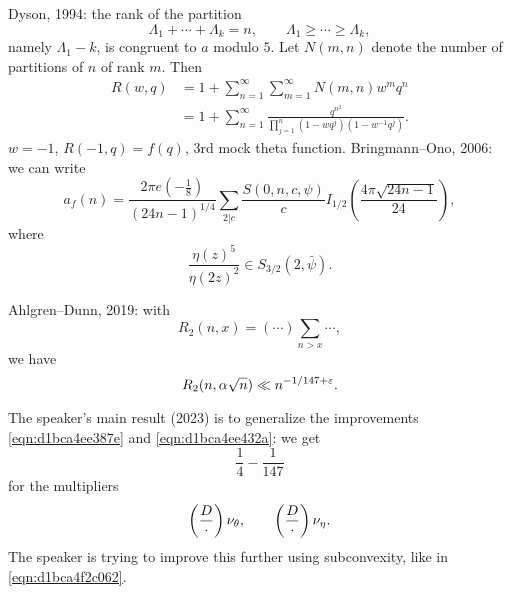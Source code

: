 \documentclass[reqno]{amsart} 
\begin{document}
\begin{enumerate}
  Dyson, 1994: the rank of the partition
  \begin{equation*}
    \Lambda_1 + \dotsb + \Lambda_k = n,
    \qquad
    \Lambda_1 \geq \dotsb \geq \Lambda_k,
  \end{equation*}
  namely $\Lambda_1 - k$, is congruent to $a$ modulo $5$.  Let $N (m, n)$ denote the number of partitions of $n$ of rank $m$.  Then
  \begin{align*}
    R (w, q) &= 1 + \sum_{n = 1}^\infty \sum_{m = 1}^\infty N (m, n) w^m q^n \\
             &=
               1 + \sum_{n = 1}^\infty
               \frac{q^{n^2 }}{\prod_{j = 1 }^n
               (1 - w q^j ) (1 - w^{-1} q^j )
               }.
  \end{align*}
  $w = - 1$, $R(-1,q) = f(q)$, $3$rd mock theta function.  Bringmann--Ono, 2006: we can write
  \begin{equation*}
    a_f (n) = \frac{2 \pi e (- \tfrac{1}{8})}{(2 4n - 1  )^{1/4} }
    \sum_{2 | c}
    \frac{S (0, n, c, \psi )}{c}
    I_{1/2} \left( \frac{4 \pi \sqrt{2 4 n - 1}}{24} \right),
  \end{equation*}
  where
  \begin{equation*}
    \frac{\eta (z)^5 }{ \eta (2 z )^2 }
    \in S_{3/2 } (2, \bar{\psi }).
  \end{equation*}

  Ahlgren--Dunn, 2019: with
  \begin{equation*}
    R_2(n,x) = (\dotsb) \sum_{n > x} \dotsb,
  \end{equation*}
  we have
  \begin{equation*}
    R_2 (n, \alpha \sqrt{n}) \ll n^{- 1 / 147 + \varepsilon}.
  \end{equation*}
\end{enumerate}
The speaker's main result (2023) is to generalize the improvements \eqref{eqn:d1bca4ee387e} and \eqref{eqn:d1bca4ee432a}: we get
\begin{equation*}
\frac{1}{4} - \frac{1}{147}
\end{equation*}
for the multipliers
\begin{equation*}
\left( \frac{D}{\cdot } \right) \nu_\theta, \qquad \left( \frac{D}{\cdot } \right)  \nu_\eta.
\end{equation*}
The speaker is trying to improve this further using subconvexity, like in \eqref{eqn:d1bca4f2c062}.



{} 
\end{document}

